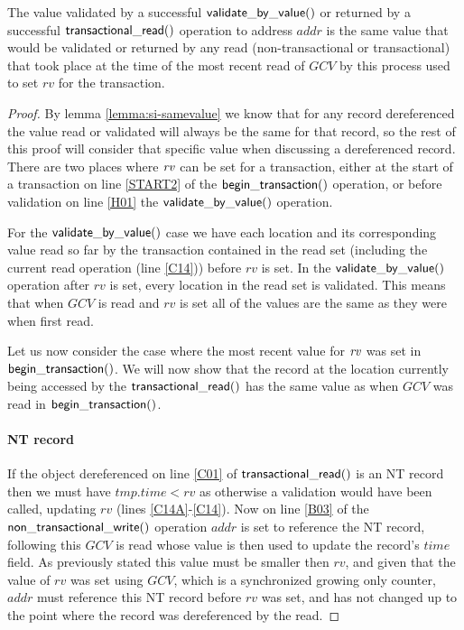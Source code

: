 \begin{lemma}
\label{lemma:si-rvvalid}
The value validated by a successful $\sf{validate\_by\_value}()$ or returned by a successful
$\sf{transactional\_read}()$ operation to address $\mathit{addr}$ is the same
value that would be validated or returned by any read (non-transactional or transactional) that took place
at the time of the most recent read of $\mathit{GCV}$ by this process used to set $\mathit{rv}$ for the transaction.
\end{lemma}
\begin{proof}
By lemma \ref{lemma:si-samevalue} we know that for any record dereferenced the value read or validated will
always be the same for that record, so the rest of this proof will consider that specific value when discussing
a dereferenced record.
There are two places where $\ms{rv}$ can be set for a transaction, either at the start of a transaction on line \ref{START2} of the
$\sf{begin\_transaction}()$ operation, or before validation on line \ref{H01} the $\sf{validate\_by\_value}()$ operation.


For the $\sf{validate\_by\_value}()$ case we have each location and its corresponding value read so far by the transaction contained
in the read set (including the current read operation (line \ref{C14})) before $\mathit{rv}$ is set.
In the $\sf{validate\_by\_value}()$ operation after $\mathit{rv}$ is set, every location in the read set is
validated.
This means that when $\mathit{GCV}$ is read and $\mathit{rv}$ is set all of the values are the same as they were when first read.

Let us now consider the case where the most recent value for $\ms{rv}$ was set in $\sf{begin\_transaction}()$.
We will now show that the record at the location currently being accessed by the $\sf{transactional\_read}()$
has the same value as when $\mathit{GCV}$ was read in $\sf{begin\_transaction}()$.

\paragraph{NT record} If the object dereferenced on line \ref{C01} of $\sf{transactional\_read}()$ is an NT record then we must have $\mathit{tmp.time} < \mathit{rv}$
as otherwise a validation would have been called, updating $\mathit{rv}$ (lines \ref{C14A}-\ref{C14}).
Now on line \ref{B03} of the $\sf{non\_transactional\_write}()$ operation $\mathit{addr}$ is set to reference the NT record, following this
$\mathit{GCV}$ is read whose value is then used to update the record's $\mathit{time}$ field.
As previously stated this value must be smaller then $\mathit{rv}$, and given that the value of $\mathit{rv}$
was set using $\mathit{GCV}$, which is a synchronized growing only counter, $\mathit{addr}$ must reference
this NT record before $\mathit{rv}$ was set, and has not changed up to the point where the record was dereferenced by the read.


\end{proof}

